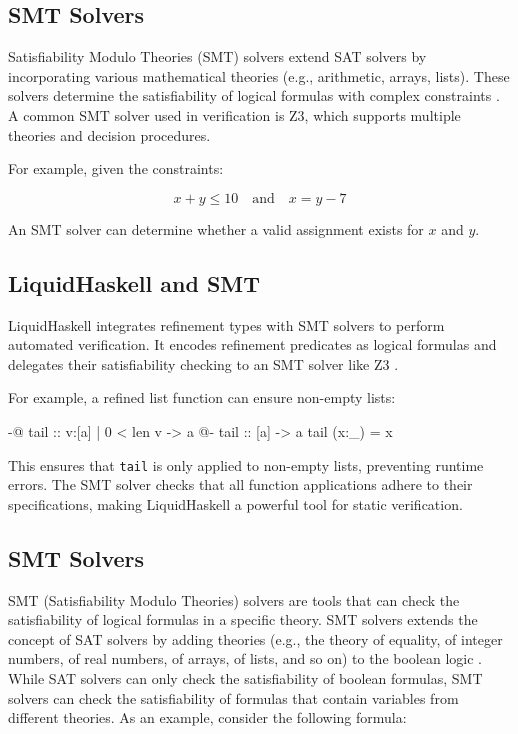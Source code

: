 \documentclass[]{rptuseminar}
\begin{document}
\subsection{SMT Solvers}
Satisfiability Modulo Theories (SMT) solvers extend SAT solvers by incorporating various 
mathematical theories (e.g., arithmetic, arrays, lists). These solvers determine the 
satisfiability of logical formulas with complex constraints \cite{clarke_satisfiability_2018}. 
A common SMT solver used in verification is Z3, which supports multiple theories and decision procedures.

For example, given the constraints:

\begin{equation}
x + y \leq 10 \quad \text{and} \quad x = y - 7
\end{equation}

An SMT solver can determine whether a valid assignment exists for \(x\) and \(y\).

\subsection{LiquidHaskell and SMT}
LiquidHaskell integrates refinement types with SMT solvers to perform automated verification. 
It encodes refinement predicates as logical formulas and delegates their satisfiability checking to an SMT solver like Z3 
\cite{vazou_refinement_2014}. 

For example, a refined list function can ensure non-empty lists:

\begin{haskell}
{-@ tail :: {v:[a] | 0 < len v} -> a @-}
tail :: [a] -> a
tail (x:_) = x
\end{haskell}

This ensures that \texttt{tail} is only applied to non-empty lists, preventing runtime errors. 
The SMT solver checks that all function applications adhere to their specifications, 
making LiquidHaskell a powerful tool for static verification.

\subsection{SMT Solvers}
SMT (Satisfiability Modulo Theories) solvers are tools that can check the satisfiability of logical formulas in a specific theory.
SMT solvers extends the concept of SAT solvers by adding theories (e.g., the theory of equality, 
of integer numbers, of real numbers, of arrays, of lists, and so on) to the boolean logic \cite{clarke_satisfiability_2018}.
While SAT solvers can only check the satisfiability of boolean formulas, SMT solvers can check the satisfiability of formulas 
that contain variables from different theories. 
As an example, consider the following formula:
\end{document}
